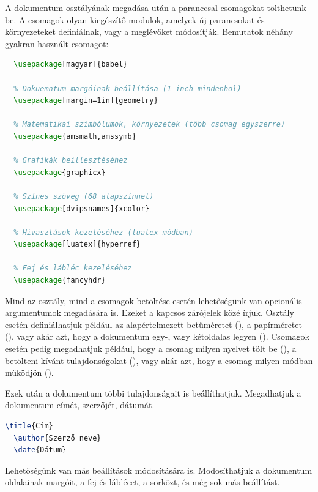 A dokumentum osztályának megadása után a
paranccsal csomagokat tölthetünk be. A csomagok olyan kiegészítő modulok,
amelyek új parancsokat és környezeteket definiálnak, vagy a meglévőket
módosítják. Bemutatok néhány gyakran használt csomagot:

\begin{lstlisting}[language=tex,caption={Népszerű \LaTeX csomagok}]
  % A magyar nyelv támogatása
  \usepackage[magyar]{babel}

  % Dokuemntum margóinak beállítása (1 inch mindenhol)
  \usepackage[margin=1in]{geometry}

  % Matematikai szimbólumok, környezetek (több csomag egyszerre)
  \usepackage{amsmath,amssymb}

  % Grafikák beillesztéséhez
  \usepackage{graphicx}

  % Színes szöveg (68 alapszínnel)
  \usepackage[dvipsnames]{xcolor}

  % Hivasztások kezeléséhez (luatex módban)
  \usepackage[luatex]{hyperref}

  % Fej és lábléc kezeléséhez
  \usepackage{fancyhdr}
\end{lstlisting}

Mind az osztály, mind a csomagok betöltése esetén lehetőségünk van opcionális
argumentumok megadására is. Ezeket a kapcsos zárójelek közé írjuk. Osztály
esetén definiálhatjuk például az alapértelmezett betűméretet
(\inlinecode{[12pt]}),
a papírméretet
(\inlinecode{[a4paper]}),
vagy akár azt, hogy a dokumentum egy-, vagy kétoldalas legyen
(\inlinecode{[twoside]}).
Csomagok esetén pedig megadhatjuk például, hogy a csomag milyen nyelvet tölt be
(),
a betölteni kívánt tulajdonságokat
(),
vagy akár azt, hogy a csomag milyen módban működjön
().

Ezek után a dokumentum többi tulajdonságait is beállíthatjuk. Megadhatjuk a
dokumentum címét, szerzőjét, dátumát.

\begin{lstlisting}[language=tex,caption={Dokumentum tulajdonságai}]
  \title{Cím}
  \author{Szerző neve}
  \date{Dátum}
\end{lstlisting}

Lehetőségünk van más beállítások módosítására is. Modosíthatjuk a dokumentum
oldalainak margóit, a fej és láblécet, a sorközt, és még sok más beállítást.

